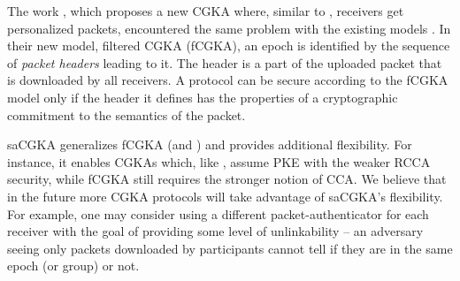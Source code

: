 
The work \cite{hashimoto2021cmpke}, which proposes a new CGKA where, similar to \saik, receivers get personalized packets, encountered the same problem with the existing models  \cite{TCC:ACJM20,EPRINT:AlwJosMul20}. In their new model, filtered CGKA (fCGKA), an epoch is identified by the sequence of \emph{packet headers} leading to it. The header is a part of the uploaded packet that is downloaded by all receivers. A protocol can be secure according to the fCGKA model only if the header it defines has the properties of a cryptographic commitment to the semantics of the packet.

saCGKA generalizes fCGKA (and \cite{TCC:ACJM20,EPRINT:AlwJosMul20}) and provides additional flexibility. For instance,
it enables CGKAs which, like \saik, assume PKE with the weaker RCCA security, while fCGKA still requires the stronger
notion of CCA. We believe that in the future more CGKA protocols will take advantage of saCGKA's flexibility. For
example, one may consider using a different packet-authenticator for each receiver with the goal of providing some level of unlinkability -- an adversary seeing only packets downloaded by participants cannot tell if they are in the same epoch (or group) or not.


